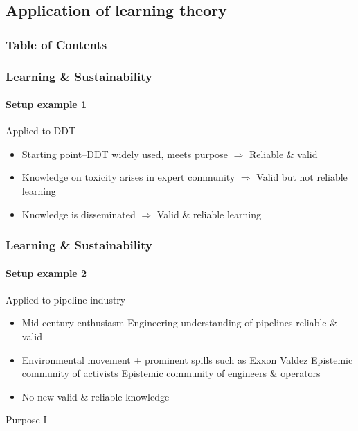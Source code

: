 
\subsection{Application of learning theory}
\begin{frame}
	\frametitle{Table of Contents}
\end{frame}

\begin{frame}
	\frametitle{Learning \& Sustainability}
	\framesubtitle{Setup example 1}
	\begin{block}{Applied to DDT \citep{Maguire2009}}
		\begin{itemize}
			\item Starting point--DDT widely used, meets purpose
				\subitem $\Rightarrow$ Reliable \& valid
			\item Knowledge on toxicity arises in expert community
				\subitem $\Rightarrow$ Valid but not reliable learning
			\item Knowledge is disseminated
				\subitem $\Rightarrow$ Valid \& reliable learning
		\end{itemize}	
	\end{block}
\end{frame}

\begin{frame}
	\frametitle{Learning \& Sustainability}
	\framesubtitle{Setup example 2}
	\begin{block}{Applied to pipeline industry}
		\begin{itemize}
			\item Mid-century enthusiasm
				\subitem Engineering understanding of pipelines reliable \& valid
			\item Environmental movement + prominent spills such as Exxon Valdez
				\subitem Epistemic community of activists \citep[e.g.,][]{Estes2019}
				\subitem Epistemic community of engineers \& operators
			\item No new valid \& reliable knowledge
		\end{itemize}	
	\end{block}
\end{frame}

\blackgroup
	\begin{frame}[plain]
		Purpose I
	\end{frame}
\egroup